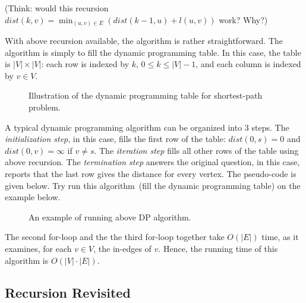 (Think: would this recursion $dist(k,v) = \min_{(u,v)\in E} (dist(k-1,u) + l(u,v))$ work? Why?)

With above recursion available, the algorithm is rather straightforward.
The algorithm is simply to fill the dynamic programming table.
In this case, the table is $|V| \times |V|$: each row is indexed by $k$, $0 \le k \le |V| - 1$, 
and each column is indexed by $v\in V$. 

\begin{figure}[h]
\centering{}
\caption{Illustration of the dynamic programming table for shortest-path problem.}
\end{figure}


A typical dynamic programming algorithm can be organized into 3 steps.
The \emph{initialization step}, in this case, fills the first row of the table:
$dist(0,s) = 0$ and $dist(0,v) = \infty$ if $v\neq s$.
The \emph{iteration step} fills all other rows of the table using above recursion.
The \emph{termination step} answers the original question, in this case,
reports that the last row gives the distance for every vertex.
The pseudo-code is given below.
Try run this algorithm~(fill the dynamic programming table) on the example below.

\begin{algorithmblock}[0.8\textwidth]
	\xxx
	\xxx
	\xxx
	\xxx
	\xxx
	\xxx
	\xxx
	\xxx
	\xxx
	\xxx
\end{algorithmblock}

\begin{figure}[h]
\centering{}
\caption{An example of running above DP algorithm.}
\end{figure}


The second for-loop and the the third for-loop together take $O(|E|)$ time,
as it examines, for each $v\in V$, the in-edges of $v$.
Hence, the running time of this algorithm is $O(|V|\cdot |E|)$.

\subsection*{Recursion Revisited}


